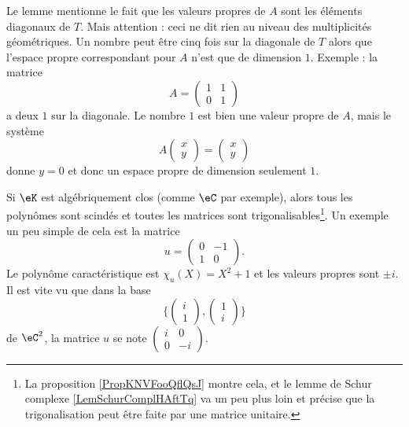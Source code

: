 \begin{remark}
    Le lemme mentionne le fait que les valeurs propres de \( A\) sont les éléments diagonaux de \( T\). Mais attention : ceci ne dit rien au niveau des multiplicités géométriques. Un nombre peut être cinq fois sur la diagonale de \( T\) alors que l'espace propre correspondant pour \( A\) n'est que de dimension \( 1\). Exemple : la matrice
    \begin{equation}
        A=\begin{pmatrix}
            1    &   1    \\ 
            0    &   1    
        \end{pmatrix}
    \end{equation}
    a deux \( 1\) sur la diagonale. Le nombre \( 1\) est bien une valeur propre de \( A\), mais le système
    \begin{equation}
        A\begin{pmatrix}
            x    \\ 
            y    
        \end{pmatrix}=\begin{pmatrix}
            x    \\ 
            y    
        \end{pmatrix}
    \end{equation}
    donne \( y=0\) et donc un espace propre de dimension seulement \( 1\).
\end{remark}

\begin{remark}  \label{RemXFZTooXkGzQg}
    Si \( \eK\) est algébriquement clos (comme \( \eC\) par exemple), alors tous les polynômes sont scindés et toutes les matrices sont trigonalisables\footnote{La proposition \ref{PropKNVFooQflQsJ} montre cela, et le lemme de Schur complexe \ref{LemSchurComplHAftTq} va un peu plus loin et précise que la trigonalisation peut être faite par une matrice unitaire.}. Un exemple un peu simple de cela est la matrice
    \begin{equation}
        u=\begin{pmatrix}
            0    &   -1    \\ 
            1    &   0    
        \end{pmatrix}.
    \end{equation}
    Le polynôme caractéristique est \( \chi_u(X)=X^2+1\) et les valeurs propres sont \( \pm i\). Il est vite vu que dans la base
    \begin{equation}
        \{ \begin{pmatrix}
        i    \\ 
    1    
\end{pmatrix}, \begin{pmatrix}
1    \\ 
i    
\end{pmatrix}\}
    \end{equation}
    de \( \eC^2\), la matrice \( u\) se note \( \begin{pmatrix}
        i    &   0    \\ 
        0    &   -i    
    \end{pmatrix}\).
\end{remark}


